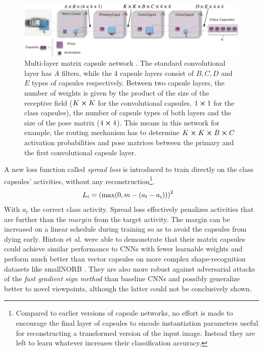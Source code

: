\begin{figure}
    \centering
    \includegraphics[width=\textwidth]{figures/matrix-capsules.png}
\caption[Multi-layer matrix capsule network]{Multi-layer matrix capsule network \cite{hinton2018matrix}. The standard convolutional layer has $A$ filters, while the 4 capsule layers consist of $B,C,D$ and $E$ types of capsules respectively. Between two capsule layers, the number of weights is given by the product of the size of the receptive field ($K\cross K$ for the convolutional capsules, $1\cross 1$ for the class capsules), the number of capsule types of both layers and the size of the pose matrix ($4\cross 4$). This means in this network for example, the routing mechanism has to determine $K\cross K\cross B\cross C$ activation probabilities and pose matrices between the primary and the first convolutional capsule layer.}\label{fig:matrix-capsules}
\end{figure}\noindent

A new loss function called \emph{spread loss} is introduced to train directly on the class capsules' activities, without any reconstruction\footnote{Compared to earlier versions of capsule networks, no effort is made to encourage the final layer of capsules to encode instantiation parameters useful for reconstructing a transformed version of the input image. Instead they are left to learn whatever increases their classification accuracy.}.
\begin{align}
    L_i &= \qty(\max(0,m-\qty(a_t-a_i)))^2
\end{align}
With $a_t$ the correct class activity. Spread loss effectively penalizes activities that are further than the $margin$ from the target activity. The margin can be increased on a linear schedule during training so as to avoid the capsules from dying early. Hinton et al. were able to demonstrate that their matrix capsules could achieve similar performance to CNNs with fewer learnable weights and perform much better than vector capsules on more complex shape-recognition datasets like smallNORB \cite{lecun2004learning}. They are also more robust against adversarial attacks of the \emph{fast gradient sign method} than baseline CNNs and possibly generalize better to novel viewpoints, although the latter could not be conclusively shown.